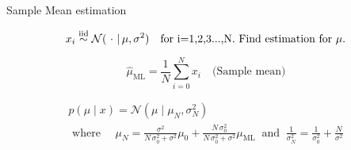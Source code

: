 \begin{frame}{Sample Mean estimation}
\begin{problem}
\begin{equation*}
x_i \overset{\text{iid}}{\sim} \mathcal{N}(\,\, \cdot \,\, | \, \mu, \sigma^2) \text{\quad  for i=1,2,3...,N}. \text{ Find estimation for }\mu.
\end{equation*}
\end{problem}
\pause
\begin{solution}
\begin{equation*}
    \hat{\mu}_{\mathrm{ML}} = \frac{1}{N} \sum_{i=0}^N{x_i} \quad \text{(Sample mean)}
\end{equation*}
\end{solution}
\pause

\begin{solution}
\begin{gather*}
p(\mu \mid x)=\mathcal{N}\left(\mu \mid \mu_{N}, \sigma_{N}^{2}\right) \\
\text{ where } \quad  \mu_{N} =\frac{\sigma^{2}}{N \, \sigma_{0}^{2}+\sigma^{2}} \mu_{0}+\frac{N \, \sigma_{0}^{2}}{N \, \sigma_{0}^{2}+\sigma^{2}} \mu_{\mathrm{ML}} \ \text{ and } \  \frac{1}{\sigma_{N}^{2}} =\frac{1}{\sigma_{0}^{2}}+\frac{N}{\sigma^{2}} 
\end{gather*}
\end{solution}


\end{frame}
